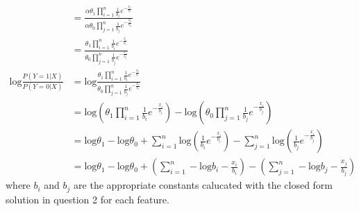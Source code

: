 \documentclass{article}
\begin{document}
\begin{enumerate}
\begin{enumerate}
\begin{align*}
                    &= \frac
                        {\alpha \theta_1 \prod\limits_{i=1}^n
                            \frac{1}{b_i} e^{-\frac{x_i}{b_i}}}
                        {\alpha \theta_0 \prod\limits_{j=1}^n
                            \frac{1}{b_j} e^{-\frac{x_j}{b_j}}} \\
                    &= \frac
                        {\theta_1 \prod\limits_{i=1}^n
                            \frac{1}{b_i} e^{-\frac{x_i}{b_i}}}
                        {\theta_0 \prod\limits_{j=1}^n
                            \frac{1}{b_j} e^{-\frac{x_i}{b_j}}} \\
                    \text{log} \frac{P(Y=1|X)}{P(Y=0|X)}
                    &= \text{log} \frac
                        {\theta_1 \prod\limits_{i=1}^n
                            \frac{1}{b_i} e^{-\frac{x_i}{b_i}}}
                        {\theta_0 \prod\limits_{j=1}^n
                            \frac{1}{b_j} e^{-\frac{x_i}{b_j}}} \\
                    &= \text{log} \left( \theta_1 \prod\limits_{i=1}^n
                            \frac{1}{b_i} e^{-\frac{x_i}{b_i}} \right) -
                        \text{log} \left( \theta_0 \prod\limits_{j=1}^n
                            \frac{1}{b_j} e^{-\frac{x_i}{b_j}} \right) \\
                    &= \text{log} \theta_1 - \text{log} \theta_0 +
                        \sum\limits_{i=1}^n \text{log} \left( \frac{1}{b_i} 
                            e^{-\frac{x_i}{b_i}} \right) -
                        \sum\limits_{j=1}^n \text{log} \left( \frac{1}{b_j}
                            e^{-\frac{x_i}{b_j}} \right) \\
                    &=  \text{log} \theta_1 - \text{log} \theta_0 +
                        \left( \sum\limits_{i=1}^n -\text{log} b_i - 
                            \frac{x_i}{b_i} \right)
                         - \left( \sum\limits_{j=1}^n - \text{log} b_j - 
                            \frac{x_j}{b_j} \right)
                \end{align*}
                where \(b_i\) and \(b_j\) are the appropriate constants
                calucated with the closed form solution in question 2 for
                each feature.
        \end{enumerate}
\end{enumerate}
\end{document}
